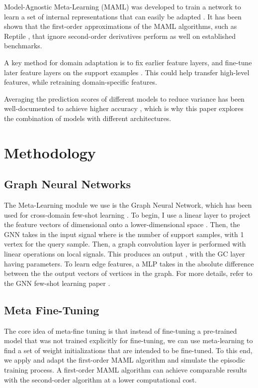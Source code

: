 \documentclass[10pt,twocolumn,letterpaper]{article}
\begin{document}
Model-Agnostic Meta-Learning (MAML) was developed to train a network to learn a set of internal representations that can easily be adapted \cite{finn2017model}. It has been shown that the first-order approximations of the MAML algorithms, such as Reptile \cite{nichol2018first}, that ignore second-order derivatives perform as well on established benchmarks.

A key method for domain adaptation is to fix earlier feature layers, and fine-tune later feature layers on the support examples \cite{guo2019new}. This could help transfer high-level features, while retraining domain-specific features. 

Averaging the prediction scores of different models to reduce variance has been well-documented to achieve higher accuracy \cite{dvornik2019diversity}, which is why this paper explores the combination of models with different architectures.

\section{Methodology}
\subsection{Graph Neural Networks}
The Meta-Learning module we use is the Graph Neural Network, which has been used for cross-domain few-shot learning \cite{tseng2020cross}. To begin, I use a linear layer to project the feature vectors of dimensional  onto a lower-dimensional space  . Then, the GNN takes in the input signal  where  is the number of support samples, with 1 vertex for the query sample. Then, a graph convolution layer  is performed with linear operations on local signals. This produces an output , with the GC layer having  parameters. To learn edge features, a MLP takes in the absolute difference between the the output vectors of vertices in the graph. For more details, refer to the GNN few-shot learning paper \cite{garcia2017few}. 

\subsection{Meta Fine-Tuning}

The core idea of meta-fine tuning is that instead of fine-tuning a pre-trained model that was not trained explicitly for fine-tuning, we can use meta-learning to find a set of weight initializations that are intended to be fine-tuned. To this end, we apply and adapt the first-order MAML algorithm \cite{nichol2018first} and simulate the episodic training process. A first-order MAML algorithm can achieve comparable results with the second-order algorithm at a lower computational cost.
\end{document}
